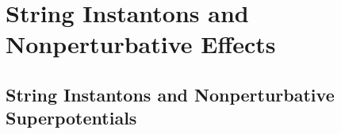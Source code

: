 \section{String Instantons and Nonperturbative Effects}

\subsection{String Instantons and Nonperturbative Superpotentials}

